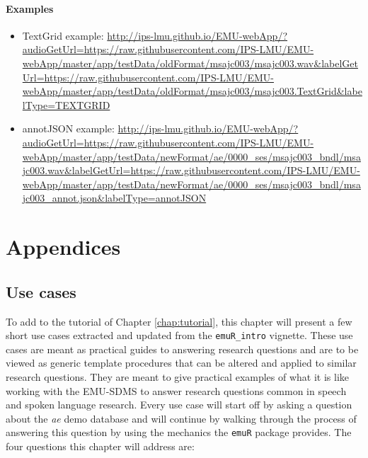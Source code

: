 \documentclass[]{book}
\providecommand{\tightlist}{%
  \setlength{\itemsep}{0pt}\setlength{\parskip}{0pt}}
\theoremstyle{definition}
\theoremstyle{definition}
\theoremstyle{definition}
\theoremstyle{remark}
\begin{document}
\hypertarget{examples-1}{%
\subsection{Examples}\label{examples-1}}

\begin{itemize}
\tightlist
\item
  TextGrid example:
  \url{http://ips-lmu.github.io/EMU-webApp/?audioGetUrl=https://raw.githubusercontent.com/IPS-LMU/EMU-webApp/master/app/testData/oldFormat/msajc003/msajc003.wav\&labelGetUrl=https://raw.githubusercontent.com/IPS-LMU/EMU-webApp/master/app/testData/oldFormat/msajc003/msajc003.TextGrid\&labelType=TEXTGRID}
\item
  annotJSON example:
  \url{http://ips-lmu.github.io/EMU-webApp/?audioGetUrl=https://raw.githubusercontent.com/IPS-LMU/EMU-webApp/master/app/testData/newFormat/ae/0000_ses/msajc003_bndl/msajc003.wav\&labelGetUrl=https://raw.githubusercontent.com/IPS-LMU/EMU-webApp/master/app/testData/newFormat/ae/0000_ses/msajc003_bndl/msajc003_annot.json\&labelType=annotJSON}
\end{itemize}

\hypertarget{part-appendices}{%
\part{Appendices}\label{part-appendices}}

\hypertarget{app-chap:useCases}{%
\chapter{Use cases}\label{app-chap:useCases}}

To add to the tutorial of Chapter \ref{chap:tutorial}, this chapter will
present a few short use cases extracted and updated from the
\texttt{emuR\_intro} vignette. These use cases are meant as practical
guides to answering research questions and are to be viewed as generic
template procedures that can be altered and applied to similar research
questions. They are meant to give practical examples of what it is like
working with the EMU-SDMS to answer research questions common in speech
and spoken language research. Every use case will start off by asking a
question about the \emph{ae} demo database and will continue by walking
through the process of answering this question by using the mechanics
the \texttt{emuR} package provides. The four questions this chapter will
address are:
\end{document}
